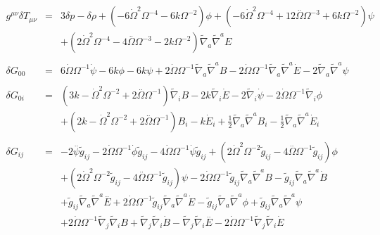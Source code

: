 \begin{eqnarray}
\nonumber\\  \nonumber\\ 
g^{\mu\nu}\delta T_{\mu\nu}&=& 3 \delta p -  \delta \rho + (-6 \dot{\Omega}^2 \Omega^{-4} - 6 k \Omega^{-2}) \phi + (-6 \dot{\Omega}^2 \Omega^{-4} + 12 \overset{..}{\Omega} \Omega^{-3} + 6 k \Omega^{-2}) \psi \nonumber \\ 
&& + (2 \dot{\Omega}^2 \Omega^{-4} - 4 \overset{..}{\Omega} \Omega^{-3} - 2 k \Omega^{-2}) \tilde{\nabla}_{a}\tilde{\nabla}^{a}E
\\ \nonumber\\
\delta G_{00}&=& 6 \dot{\Omega} \Omega^{-1} \dot{\psi} - 6 k \phi - 6 k \psi + 2 \dot{\Omega} \Omega^{-1} \tilde{\nabla}_{a}\tilde{\nabla}^{a}B - 2 \dot{\Omega} \Omega^{-1} \tilde{\nabla}_{a}\tilde{\nabla}^{a}\dot{E} - 2 \tilde{\nabla}_{a}\tilde{\nabla}^{a}\psi 
\nonumber\\  \\ 
\delta G_{0i}&=& (3 k -  \dot{\Omega}^2 \Omega^{-2} + 2 \overset{..}{\Omega} \Omega^{-1}) \tilde{\nabla}_{i}B - 2 k \tilde{\nabla}_{i}\dot{E} - 2 \tilde{\nabla}_{i}\dot{\psi} - 2 \dot{\Omega} \Omega^{-1} \tilde{\nabla}_{i}\phi 
\nonumber\\
&&+(2 k -  \dot{\Omega}^2 \Omega^{-2} + 2 \overset{..}{\Omega} \Omega^{-1}) B_{i} -  k \dot{E}_{i} + \tfrac{1}{2} \tilde{\nabla}_{a}\tilde{\nabla}^{a}B_{i} -  \tfrac{1}{2} \tilde{\nabla}_{a}\tilde{\nabla}^{a}\dot{E}_{i}
\\  \nonumber\\ 
\delta G_{ij}&=& -2 \overset{..}{\psi} \tilde{g}_{ij} - 2 \dot{\Omega} \Omega^{-1} \dot{\phi} \tilde{g}_{ij} - 4 \dot{\Omega} \Omega^{-1} \dot{\psi} \tilde{g}_{ij} + (2 \dot{\Omega}^2 \Omega^{-2} \tilde{g}_{ij} - 4 \overset{..}{\Omega} \Omega^{-1} \tilde{g}_{ij}) \phi \nonumber \\ 
&& + (2 \dot{\Omega}^2 \Omega^{-2} \tilde{g}_{ij} - 4 \overset{..}{\Omega} \Omega^{-1} \tilde{g}_{ij}) \psi - 2 \dot{\Omega} \Omega^{-1} \tilde{g}_{ij} \tilde{\nabla}_{a}\tilde{\nabla}^{a}B -  \tilde{g}_{ij} \tilde{\nabla}_{a}\tilde{\nabla}^{a}\dot{B} 
\nonumber\\
&&+ \tilde{g}_{ij} \tilde{\nabla}_{a}\tilde{\nabla}^{a}\overset{..}{E}  + 2 \dot{\Omega} \Omega^{-1} \tilde{g}_{ij} \tilde{\nabla}_{a}\tilde{\nabla}^{a}\dot{E} -  \tilde{g}_{ij} \tilde{\nabla}_{a}\tilde{\nabla}^{a}\phi + \tilde{g}_{ij} \tilde{\nabla}_{a}\tilde{\nabla}^{a}\psi 
\nonumber\\
&&+ 2 \dot{\Omega} \Omega^{-1} \tilde{\nabla}_{j}\tilde{\nabla}_{i}B + \tilde{\nabla}_{j}\tilde{\nabla}_{i}\dot{B} -  \tilde{\nabla}_{j}\tilde{\nabla}_{i}\overset{..}{E}  - 2 \dot{\Omega} \Omega^{-1} \tilde{\nabla}_{j}\tilde{\nabla}_{i}\dot{E} 

\end{eqnarray}
